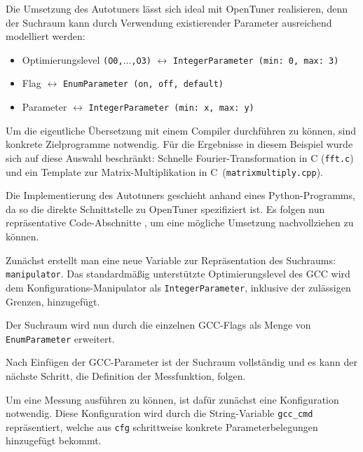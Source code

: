\documentclass[a4paper,11pt]{scrartcl}
\def\CC{{C\nolinebreak[4]\hspace{-.05em}\raisebox{.4ex}{\tiny\bf ++}}}
\begin{document}
Die Umsetzung des Autotuners lässt sich ideal mit OpenTuner realisieren, denn der
Suchraum kann durch Verwendung existierender Parameter ausreichend modelliert werden:
\begin{itemize}
  \item Optimierungslevel \texttt{(O0,$\ldots$,O3)} $\leftrightarrow$ \texttt{IntegerParameter~(min:~0, max:~3)}
  \item Flag $\leftrightarrow$ \texttt{EnumParameter~(on,~off,~default)}
  \item Parameter $\leftrightarrow$ \texttt{IntegerParameter~(min:~x, max:~y)}
\end{itemize}
Um die eigentliche Übersetzung mit einem Compiler durchführen zu können, sind konkrete
Zielprogramme notwendig. Für die Ergebnisse in diesem Beispiel wurde sich auf diese
Auswahl beschränkt: Schnelle Fourier-Transformation in C (\texttt{fft.c}) und 
ein Template zur Matrix-Multiplikation in \CC~(\texttt{matrixmultiply.cpp}). \newline

Die Implementierung des Autotuners geschieht anhand eines Python-Programms, da so die direkte Schnittstelle
zu OpenTuner spezifiziert ist. Es folgen nun repräsentative Code-Abschnitte \cite[S.~3]{OT-paper}, um eine
mögliche Umsetzung nachvollziehen zu können.  \newline


Zunächst erstellt man eine neue Variable zur Repräsentation des Suchraums: \texttt{manipulator}.
Das standardmäßig unterstützte Optimierungslevel des GCC wird dem Konfigurations-Manipulator
als \texttt{IntegerParameter}, inklusive der zulässigen Grenzen, hinzugefügt. \newline


Der Suchraum wird nun durch die einzelnen GCC-Flags als Menge von \texttt{EnumParameter} 
erweitert. \newline


Nach Einfügen der GCC-Parameter ist der Suchraum vollständig und es kann der nächste Schritt,
die Definition der Messfunktion, folgen. \newline


Um eine Messung ausführen zu können, ist dafür zunächst eine Konfiguration notwendig.
Diese Konfiguration wird durch die String-Variable \texttt{gcc\_cmd} repräsentiert, welche
aus \texttt{cfg} schrittweise konkrete Parameterbelegungen hinzugefügt bekommt. \newline
\end{document}
